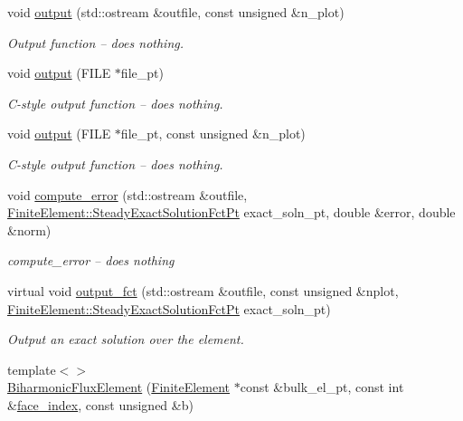 \begin{DoxyCompactItemize}
void \hyperlink{classoomph_1_1BiharmonicFluxElement_a6fe872f8689f493bbcd2f251106284dd}{output} (std\+::ostream \&outfile, const unsigned \&n\+\_\+plot)
\begin{DoxyCompactList}\small\item\em Output function -- does nothing. \end{DoxyCompactList}\item 
void \hyperlink{classoomph_1_1BiharmonicFluxElement_a8cb3a9fb35eb58eff73bd8f0f96baf05}{output} (F\+I\+LE $\ast$file\+\_\+pt)
\begin{DoxyCompactList}\small\item\em C-\/style output function -- does nothing. \end{DoxyCompactList}\item 
void \hyperlink{classoomph_1_1BiharmonicFluxElement_ad5e4addb8deb7cf8df09e7f9ea23e155}{output} (F\+I\+LE $\ast$file\+\_\+pt, const unsigned \&n\+\_\+plot)
\begin{DoxyCompactList}\small\item\em C-\/style output function -- does nothing. \end{DoxyCompactList}\item 
void \hyperlink{classoomph_1_1BiharmonicFluxElement_a91c948732fb3994a347faf3fd07e3875}{compute\+\_\+error} (std\+::ostream \&outfile, \hyperlink{classoomph_1_1FiniteElement_a690fd33af26cc3e84f39bba6d5a85202}{Finite\+Element\+::\+Steady\+Exact\+Solution\+Fct\+Pt} exact\+\_\+soln\+\_\+pt, double \&error, double \&norm)
\begin{DoxyCompactList}\small\item\em compute\+\_\+error -- does nothing \end{DoxyCompactList}\item 
virtual void \hyperlink{classoomph_1_1BiharmonicFluxElement_af8520446e8c6194b43081bbb5e479bdd}{output\+\_\+fct} (std\+::ostream \&outfile, const unsigned \&nplot, \hyperlink{classoomph_1_1FiniteElement_a690fd33af26cc3e84f39bba6d5a85202}{Finite\+Element\+::\+Steady\+Exact\+Solution\+Fct\+Pt} exact\+\_\+soln\+\_\+pt)
\begin{DoxyCompactList}\small\item\em Output an exact solution over the element. \end{DoxyCompactList}\item 
{\footnotesize template$<$$>$ }\\\hyperlink{classoomph_1_1BiharmonicFluxElement_a5f8fc9a2737aff79dca7309f8fd2eb71}{Biharmonic\+Flux\+Element} (\hyperlink{classoomph_1_1FiniteElement}{Finite\+Element} $\ast$const \&bulk\+\_\+el\+\_\+pt, const int \&\hyperlink{classoomph_1_1FaceElement_a478d577ac6db67ecc80f1f02ae3ab170}{face\+\_\+index}, const unsigned \&b)
\end{DoxyCompactItemize}
